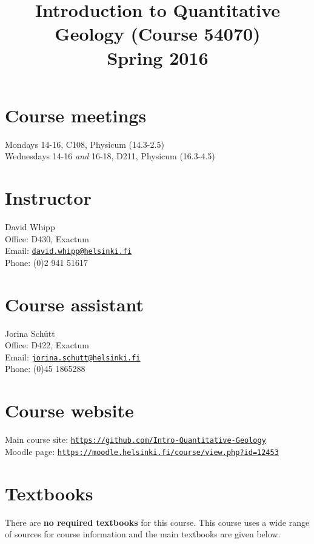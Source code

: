 \documentclass[11pt,a4paper]{article}
\begin{document}
\title{Introduction to Quantitative Geology (Course 54070)\\Spring 2016}
\author{}
\date{}
\maketitle

\section*{Course meetings}
Mondays 14-16, C108, Physicum (14.3-2.5)\\
Wednesdays 14-16 \textit{and} 16-18, D211, Physicum (16.3-4.5)

\section*{Instructor}
David Whipp\\
Office: D430, Exactum\\
Email: \href{mailto:david.whipp@helsinki.fi}{\texttt{david.whipp@helsinki.fi}}\\
Phone: (0)2 941 51617

\section*{Course assistant}
Jorina Sch\"{u}tt\\
Office: D422, Exactum\\
Email: \href{mailto:jorina.schutt@helsinki.fi}{\texttt{jorina.schutt@helsinki.fi}}\\
Phone: (0)45 1865288

\section*{Course website}
Main course site: \href{https://github.com/Intro-Quantitative-Geology}{\texttt{https://github.com/Intro-Quantitative-Geology}}\\
Moodle page: \href{https://moodle.helsinki.fi/course/view.php?id=12453}{\texttt{https://moodle.helsinki.fi/course/view.php?id=12453}}

\section*{Textbooks}
There are \textbf{no required textbooks} for this course. This course uses a wide range of sources for course information and the main textbooks are given below.\\
\end{document}
